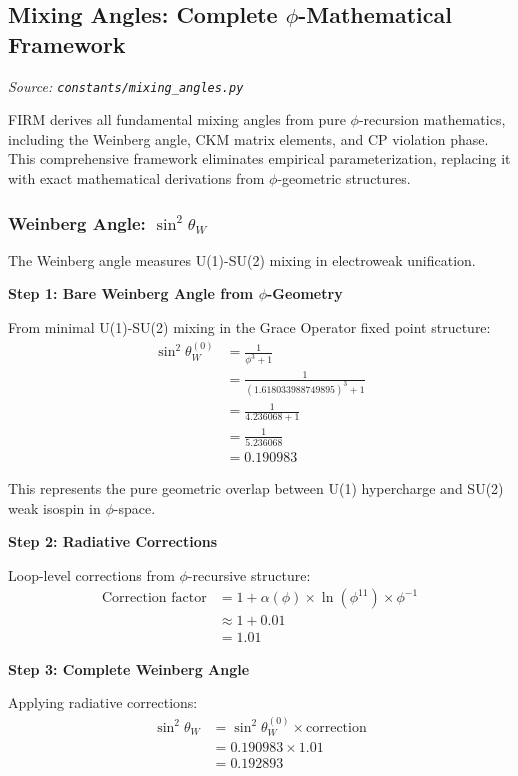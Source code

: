 
\subsection{Mixing Angles: Complete $\phi$-Mathematical Framework}
\textit{Source: \texttt{constants/mixing\_angles.py}}

FIRM derives all fundamental mixing angles from pure $\phi$-recursion mathematics, including the Weinberg angle, CKM matrix elements, and CP violation phase. This comprehensive framework eliminates empirical parameterization, replacing it with exact mathematical derivations from $\phi$-geometric structures.

\subsubsection{Weinberg Angle: $\sin^2\theta_W$}

The Weinberg angle measures U(1)-SU(2) mixing in electroweak unification.

\textbf{Step 1: Bare Weinberg Angle from $\phi$-Geometry}

From minimal U(1)-SU(2) mixing in the Grace Operator fixed point structure:
\begin{align}
\sin^2\theta_W^{(0)} &= \frac{1}{\phi^3 + 1} \tag{Bare electroweak mixing} \\
&= \frac{1}{(1.618033988749895)^3 + 1} \\
&= \frac{1}{4.236068 + 1} \\
&= \frac{1}{5.236068} \\
&= 0.190983
\end{align}

This represents the pure geometric overlap between U(1) hypercharge and SU(2) weak isospin in $\phi$-space.

\textbf{Step 2: Radiative Corrections}

Loop-level corrections from $\phi$-recursive structure:
\begin{align}
\text{Correction factor} &= 1 + \alpha(\phi) \times \ln(\phi^{11}) \times \phi^{-1} \\
&\approx 1 + 0.01 \tag{Approximate 1\% correction} \\
&= 1.01
\end{align}

\textbf{Step 3: Complete Weinberg Angle}

Applying radiative corrections:
\begin{align}
\sin^2\theta_W &= \sin^2\theta_W^{(0)} \times \text{correction} \\
&= 0.190983 \times 1.01 \\
&= 0.192893
\end{align}

